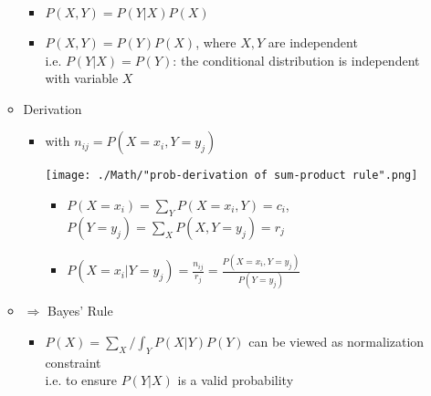 \begin{itemize}
\begin{itemize}
\begin{itemize}
		\item $P(X, Y) = P(Y|X)P(X)$
		\item $P(X, Y) = P(Y)P(X)$, where $X,Y$ are independent \\
		i.e. $P(Y|X)=P(Y)$: the conditional distribution is independent with variable $X$
		\end{itemize}
	\item Derivation
		\begin{itemize}
		\item with $n_{ij}=P(X=x_i, Y=y_j)$ \\
		\begin{minipage}[r]{.3\linewidth}
		\texttt{[image: ./Math/"prob-derivation of sum-product rule".png]}
		\end{minipage}
		\begin{minipage}[l]{.7\linewidth}
			\begin{itemize}
			\item $P(X=x_i)=\sum_Y P(X=x_i, Y)=c_i$, \\ 
			$P(Y=y_j)=\sum_XP(X, Y=y_j)=r_j$
			\item $P(X=x_i|Y=y_j) = \frac{n_{ij}}{r_j} = \frac{P(X=x_i,Y=y_j)}{P(Y=y_j)}$
			\end{itemize}
		\end{minipage}
		\end{itemize}
	\item $\Rightarrow$ Bayes' Rule
		\begin{itemize}
		\Item \begin{align*}
		\displaystyle P(Y|X) = \frac {P(X|Y)P(Y)} {P(X)} &= \frac{P(X|Y)P(Y)}{\sum_YP(X|Y)P(Y)} \text{, where } Y \text{ are discrete} \\
		&=\frac{P(X|Y)P(Y)}{\int_YP(X|Y)P(Y)} \text{, where } Y \text{ are continuous}
		\end{align*}
		\item $P(X)=\sum_X / \int_Y P(X|Y)P(Y)$ can be viewed as normalization constraint \\ 
		i.e. to ensure $P(Y|X)$ is a valid probability
		\end{itemize}
	\end{itemize}
\end{itemize}
 
